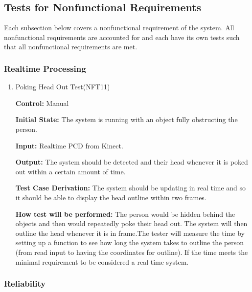 \documentclass[12pt, titlepage]{article}
\begin{document}
\subsection{Tests for Nonfunctional Requirements}

Each subsection below covers a nonfunctional requirement of the system. All nonfunctional requirements are accounted for and each have its own tests such that all nonfunctional requirements are met.

\subsubsection{Realtime Processing}

\begin{enumerate}

\item{Poking Head Out Test(NFT11)\\}

\textbf{Control:} Manual

\textbf{Initial State:} The system is running with an object fully obstructing the person.

\textbf{Input:} Realtime PCD from Kinect.

\textbf{Output:} The system should be detected and their head whenever it is poked out within a certain amount of time.

\textbf{Test Case Derivation:} The system should be updating in real time and so it should be able to display the head outline within two frames.

\textbf{How test will be performed:} The person would be hidden behind the objects and then would repeatedly poke their head out. The system will then outline the head whenever it is in frame.The tester will measure the time by setting up a function to see how long the system takes to outline the person (from read input to having the coordinates for outline). If the time meets the minimal requirement to be considered a real time system.

\end{enumerate}

\subsubsection{Reliability}
\end{document}
